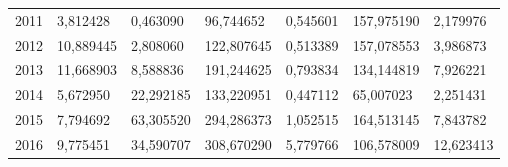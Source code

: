 \begin{table}
\begin{tabular}{p{1cm}p{2cm}p{2cm}p{2cm}p{2cm}p{2cm}p{2cm}}
 2011 &                               3,812428 &                 0,463090 &  96,744652 &     0,545601 & 157,975190 &                            2,179976 \\
 2012 &                              10,889445 &                 2,808060 & 122,807645 &     0,513389 & 157,078553 &                            3,986873 \\
 2013 &                              11,668903 &                 8,588836 & 191,244625 &     0,793834 & 134,144819 &                            7,926221 \\
 2014 &                               5,672950 &                22,292185 & 133,220951 &     0,447112 &  65,007023 &                            2,251431 \\
 2015 &                               7,794692 &                63,305520 & 294,286373 &     1,052515 & 164,513145 &                            7,843782 \\
 2016 &                               9,775451 &                34,590707 & 308,670290 &     5,779766 & 106,578009 &                           12,623413 \\
\bottomrule
\end{tabular}
\end{table}
